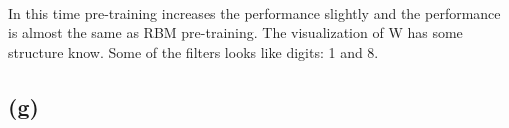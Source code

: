 \documentclass[twoside]{article}
\begin{document}
\begin{figure}[h]
{\begin{minipage}[b]{0.4\textwidth}
\end{minipage}
}
\end{figure}

\paragraph{} In this time pre-training increases the performance slightly and the performance is almost the same as RBM pre-training. The visualization of W has some structure know. Some of the filters looks like digits: 1 and 8. 

\subsection{(g)}

\begin{figure}[h]
\centering
{}
\end{figure}
\end{document}
